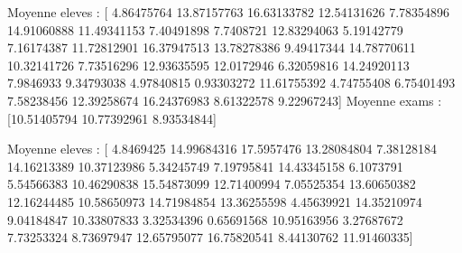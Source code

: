 \documentclass[letterpaper,10pt,english]{sphinxhowto}
\begin{document}
\begin{sphinxVerbatim}[commandchars=\\\{\}]
  
  

\end{sphinxVerbatim}

\begin{sphinxVerbatim}[commandchars=\\\{\}]
Moyenne eleves : [ 4.86475764 13.87157763 16.63133782 12.54131626  7.78354896 14.91060888
 11.49341153  7.40491898  7.7408721  12.83294063  5.19142779  7.16174387
 11.72812901 16.37947513 13.78278386  9.49417344 14.78770611 10.32141726
  7.73516296 12.93635595 12.0172946   6.32059816 14.24920113  7.9846933
  9.34793038  4.97840815  0.93303272 11.61755392  4.74755408  6.75401493
  7.58238456 12.39258674 16.24376983  8.61322578  9.22967243]
Moyenne exams : [10.51405794 10.77392961  8.93534844]
\end{sphinxVerbatim}

\begin{sphinxVerbatim}[commandchars=\\\{\}]
  \PYG{p}{[}  \PYG{p}{]}\PYG{p}{[} \PYG{p}{]}
\end{sphinxVerbatim}

\begin{sphinxVerbatim}[commandchars=\\\{\}]
Moyenne eleves : [ 4.8469425  14.99684316 17.5957476  13.28084804  7.38128184 14.16213389
 10.37123986  5.34245749  7.19795841 14.43345158  6.1073791   5.54566383
 10.46290838 15.54873099 12.71400994  7.05525354 13.60650382 12.16244485
 10.58650973 14.71984854 13.36255598  4.45639921 14.35210974  9.04184847
 10.33807833  3.32534396  0.65691568 10.95163956  3.27687672  7.73253324
  8.73697947 12.65795077 16.75820541  8.44130762 11.91460335]
\end{sphinxVerbatim}



\renewcommand{\indexname}{Index}
\printindex
\end{document}
